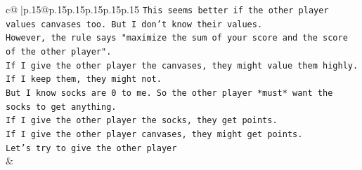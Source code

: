 \documentclass{article}
\begin{document}
{\begin{supertabular}{c@{$\;$}|p{.15\linewidth}@{}p{.15\linewidth}p{.15\linewidth}p{.15\linewidth}p{.15\linewidth}p{.15\linewidth}}
{{{\texttt{This seems better if the other player values canvases too. But I don't know their values.} \\
\texttt{However, the rule says "maximize the sum of your score and the score of the other player".} \\
\texttt{If I give the other player the canvases, they might value them highly. If I keep them, they might not.} \\
\texttt{But I know socks are 0 to me. So the other player *must* want the socks to get anything.} \\
\texttt{If I give the other player the socks, they get points.} \\
\texttt{If I give the other player canvases, they might get points.} \\
\texttt{Let's try to give the other player} \\
            }
        }
    }
    & \\ \\


\end{supertabular}}
\end{document}
